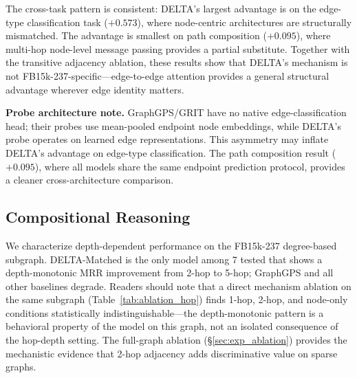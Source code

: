 \documentclass{article}
\begin{document}
The cross-task pattern is consistent: DELTA's largest advantage is on the edge-type classification task ($+0.573$), where node-centric architectures are structurally mismatched. The advantage is smallest on path composition ($+0.095$), where multi-hop node-level message passing provides a partial substitute. Together with the transitive adjacency ablation, these results show that DELTA's mechanism is not FB15k-237-specific---edge-to-edge attention provides a general structural advantage wherever edge identity matters.

\textbf{Probe architecture note.} GraphGPS/GRIT have no native edge-classification head; their probes use mean-pooled endpoint node embeddings, while DELTA's probe operates on learned edge representations. This asymmetry may inflate DELTA's advantage on edge-type classification. The path composition result ($+0.095$), where all models share the same endpoint prediction protocol, provides a cleaner cross-architecture comparison.

\subsection{Compositional Reasoning}
\label{sec:exp_compositional}

We characterize depth-dependent performance on the FB15k-237 degree-based subgraph. DELTA-Matched is the only model among 7 tested that shows a depth-monotonic MRR improvement from 2-hop to 5-hop; GraphGPS and all other baselines degrade. Readers should note that a direct mechanism ablation on the same subgraph (Table~\ref{tab:ablation_hop}) finds 1-hop, 2-hop, and node-only conditions statistically indistinguishable---the depth-monotonic pattern is a behavioral property of the model on this graph, not an isolated consequence of the hop-depth setting. The full-graph ablation (\S\ref{sec:exp_ablation}) provides the mechanistic evidence that 2-hop adjacency adds discriminative value on sparse graphs.
\end{document}
